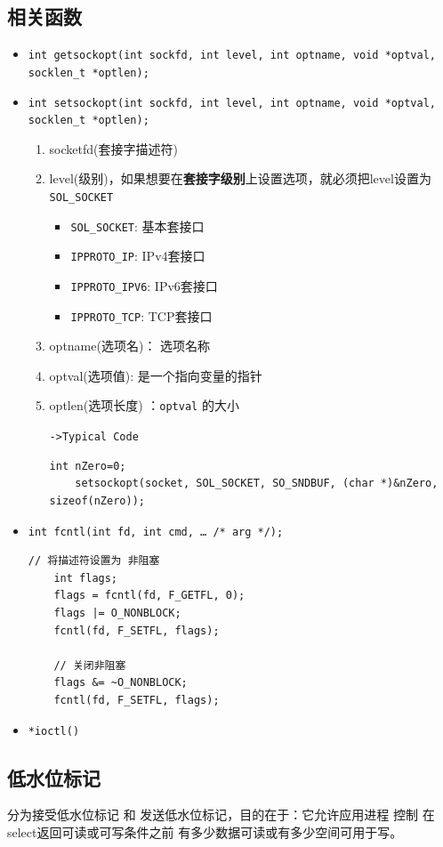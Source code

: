 \documentclass[UTF8,a4paper,8pt]{ctexbook}
\begin{document}
		\subsection{相关函数}
			\begin{itemize}
				\item \verb|int getsockopt(int sockfd, int level, int optname, void *optval, socklen_t *optlen);|
				\item \verb|int setsockopt(int sockfd, int level, int optname, void *optval, socklen_t *optlen);|
					\begin{enumerate}
						\item socketfd(套接字描述符)
						\item level(级别)，如果想要在\textbf{套接字级别}上设置选项，就必须把level设置为\verb|SOL_SOCKET|
							\begin{itemize}
								\item \verb|SOL_SOCKET|: 基本套接口
								\item \verb|IPPROTO_IP|: IPv4套接口
								\item \verb|IPPROTO_IPV6|: IPv6套接口
								\item \verb|IPPROTO_TCP|: TCP套接口
							\end{itemize}
						\item optname(选项名)： 选项名称
						\item optval(选项值): 是一个指向变量的指针 
						\item optlen(选项长度) ：\verb|optval| 的大小
						
							\verb|->Typical Code|
							\begin{lstlisting}[frame=L]
	int nZero=0;
	setsockopt(socket, SOL_S0CKET, SO_SNDBUF, (char *)&nZero, sizeof(nZero));
							\end{lstlisting}
					\end{enumerate}
				\item \verb|int fcntl(int fd, int cmd, … /* arg */);|
					\begin{lstlisting}[frame=L]
	// 将描述符设置为 非阻塞
	int flags;
	flags = fcntl(fd, F_GETFL, 0);
	flags |= O_NONBLOCK;
	fcntl(fd, F_SETFL, flags);
	
	// 关闭非阻塞
	flags &= ~O_NONBLOCK;
	fcntl(fd, F_SETFL, flags);	
					\end{lstlisting}
				\item \verb|*ioctl()|
			\end{itemize}
		\subsection{低水位标记}
			分为接受低水位标记 和 发送低水位标记，目的在于：它允许应用进程 控制 在select返回可读或可写条件之前 有多少数据可读或有多少空间可用于写。
			
\end{document}
